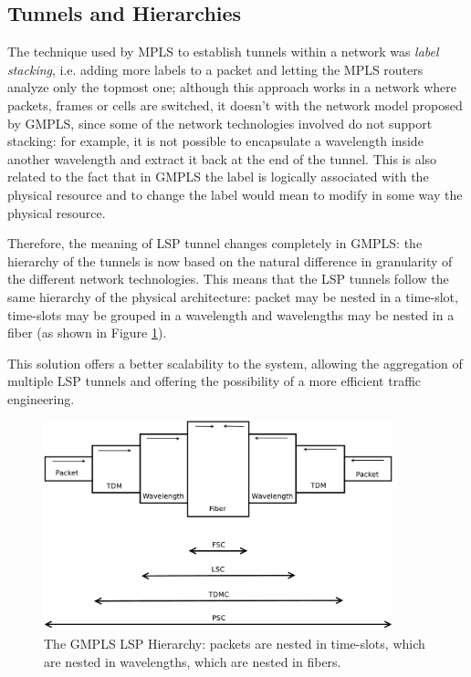 \documentclass[10pt,a4paper]{report}
\begin{document}
\subsection{Tunnels and Hierarchies}

The technique used by MPLS to establish tunnels within a network was
\textit{label stacking}, i.e. adding more labels to a packet and
letting the MPLS routers analyze only the topmost one; although this
approach works in a network where packets, frames or cells are
switched, it doesn't with the network model proposed by GMPLS, since
some of the network technologies involved do not support stacking: for
example, it is not possible to encapsulate a wavelength inside another
wavelength and extract it back at the end of the tunnel. This is also
related to the fact that in GMPLS the label is logically associated
with the physical resource and to change the label would mean to
modify in some way the physical resource.

Therefore, the meaning of LSP tunnel changes completely in GMPLS: the
hierarchy of the tunnels is now based on the natural difference in
granularity of the different network technologies. This means that the
LSP tunnels follow the same hierarchy of the physical architecture:
packet may be nested in a time-slot, time-slots may be grouped in a
wavelength and wavelengths may be nested in a fiber (as shown in
Figure \ref{fig:gmpls_hierarchy}). 

This solution offers a better scalability to the system, allowing the
aggregation of multiple LSP tunnels and offering the possibility of a
more efficient traffic engineering.

\begin{figure}[!htbp]
  \centering
  \includegraphics[width=0.9\textwidth]{img/gmpls_hierarchy}
  \caption[GMPLS LSP Hierarchy]{The GMPLS LSP Hierarchy: packets
    are nested in time-slots, which are nested in wavelengths, which
    are nested in fibers.}
  \label{fig:gmpls_hierarchy}
\end{figure}
\end{document}
